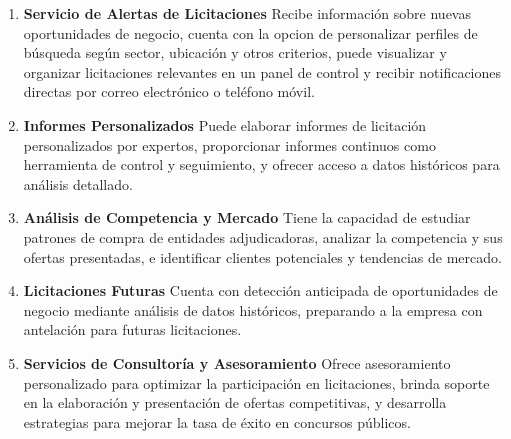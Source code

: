 \documentclass{article}
\begin{document}
  \begin{enumerate}
    \item \textbf{Servicio de Alertas de Licitaciones}
    \newline
        Recibe información sobre nuevas oportunidades de negocio, cuenta con la opcion de personalizar perfiles de búsqueda según sector, ubicación y otros criterios, puede visualizar y organizar licitaciones relevantes en un panel de control y recibir notificaciones directas por correo electrónico o teléfono móvil.

    \item \textbf{Informes Personalizados}
    \newline
        Puede elaborar informes de licitación personalizados por expertos, proporcionar informes continuos como herramienta de control y seguimiento, y ofrecer acceso a datos históricos para análisis detallado.

    \item \textbf{Análisis de Competencia y Mercado}
    \newline
        Tiene la capacidad de estudiar patrones de compra de entidades adjudicadoras, analizar la competencia y sus ofertas presentadas, e identificar clientes potenciales y tendencias de mercado.
        
    \item \textbf{Licitaciones Futuras}
    \newline
        Cuenta con detección anticipada de oportunidades de negocio mediante análisis de datos históricos, preparando a la empresa con antelación para futuras licitaciones.

    \item \textbf{Servicios de Consultoría y Asesoramiento}
    \newline
        Ofrece asesoramiento personalizado para optimizar la participación en licitaciones, brinda soporte en la elaboración y presentación de ofertas competitivas, y desarrolla estrategias para mejorar la tasa de éxito en concursos públicos.
        
    \end{enumerate}
    \cite{licitaciones}
  
\end{document}
